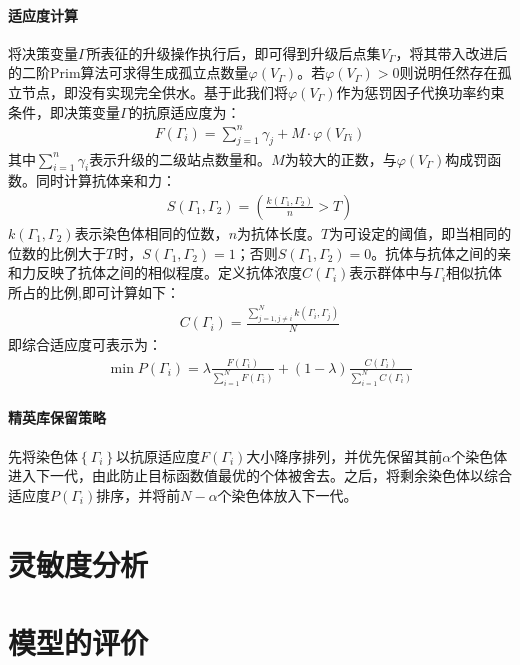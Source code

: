 \documentclass{whutmod}
\begin{document}
     	\paragraph{适应度计算}
    将决策变量$\Gamma$所表征的升级操作执行后，即可得到升级后点集$V_{\Gamma}$，将其带入改进后的二阶Prim算法可求得生成孤立点数量$\varphi(V_{\Gamma})$。若$\varphi(V_{\Gamma})>0$则说明任然存在孤立节点，即没有实现完全供水。基于此我们将$\varphi(V_{\Gamma})$作为惩罚因子代换功率约束条件，即决策变量$\Gamma$的抗原适应度为：
    	\begin{gather}
    	F(\Gamma_i)=\sum_{j=1}^{n}\gamma_j+ M\cdot  \varphi(V_{\Gamma i})
    	\end{gather}
    其中$\displaystyle \sum_{i=1}^{n}\gamma_i$表示升级的二级站点数量和。$M$为较大的正数，与$\varphi(V_{\Gamma})$构成罚函数。同时计算抗体亲和力：
    	\begin{gather}
    	S(\Gamma_1,\Gamma_2)=(\frac{k(\Gamma_1,\Gamma_2)}{n}>T)
        \end{gather}
    $k(\Gamma_1,\Gamma_2)$表示染色体相同的位数，$n$为抗体长度。$T$为可设定的阈值，即当相同的位数的比例大于$T$时，$S(\Gamma_1,\Gamma_2)=1$；否则$S(\Gamma_1,\Gamma_2)=0$。抗体与抗体之间的亲和力反映了抗体之间的相似程度。定义抗体浓度$C(\Gamma_i)$表示群体中与$\Gamma_i$相似抗体所占的比例,即可计算如下：
     \begin{gather}
     C(\Gamma_i)=\displaystyle \frac{\displaystyle \sum _{j=1,j\neq i}^N k(\Gamma_i,\Gamma_j)}{N}
     \end{gather}
     即综合适应度可表示为：
  	 \begin{gather}
  \min	P(\Gamma_i)=\lambda \frac{F(\Gamma_i)}{\displaystyle \sum _{i=1}^N F(\Gamma_i)}+(1-\lambda )\frac{C(\Gamma_i)}{\displaystyle \sum _{i=1}^N C(\Gamma_i)}
  	\end{gather}
  	\paragraph{精英库保留策略}
  	先将染色体$\left \{ \Gamma_i \right \}$以抗原适应度$F(\Gamma_i)$大小降序排列，并优先保留其前$\alpha$个染色体进入下一代，由此防止目标函数值最优的个体被舍去。之后，将剩余染色体以综合适应度$P(\Gamma_i)$排序，并将前$N-\alpha$个染色体放入下一代。
  	
  	
  	\section{灵敏度分析}
 
  	\section{模型的评价}
\end{document}
